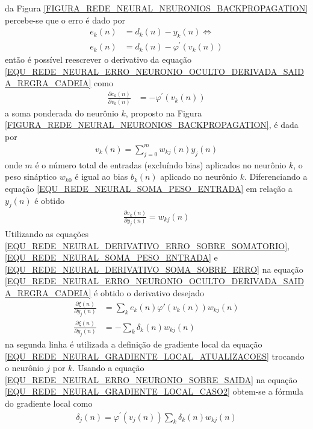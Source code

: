 da Figura \ref{FIGURA_REDE_NEURAL_NEURONIOS_BACKPROPAGATION} percebe-se que o erro é dado por
\begin{align}
e_{k}(n) &= d_{k}(n) - y_{k}(n) \Leftrightarrow \\
e_{k}(n) &= d_{k}(n) - \varphi^{'}(v_{k}(n))
\end{align}
então é possível reescrever o derivativo da equação \eqref{EQU_REDE_NEURAL_ERRO_NEURONIO_OCULTO_DERIVADA_SAIDA_REGRA_CADEIA} como
\begin{align}
\frac{\partial e_{k}(n)}{\partial v_{k}(n)} &= -\varphi^{'}(v_{k}(n))	\label{EQU_REDE_NEURAL_DERIVATIVO_ERRO_SOBRE_SOMATORIO}	   
\end{align}
a soma ponderada do neurônio \(k\), proposto na Figura \ref{FIGURA_REDE_NEURAL_NEURONIOS_BACKPROPAGATION}, é dada por
\begin{align}
v_{k}(n) = \sum\limits_{j = 0}^{m} w_{kj}(n)y_{j}(n)  \label{EQU_REDE_NEURAL_SOMA_PESO_ENTRADA}
\end{align}
onde \(m\) é o número total de entradas (excluíndo bias) aplicados no neurônio \(k\), o peso sináptico \(w_{k0}\) é igual ao bias \(b_{k}(n)\) aplicado no neurônio \(k\). Diferenciando a equação \eqref{EQU_REDE_NEURAL_SOMA_PESO_ENTRADA} em relação a \(y_{j}(n)\) é obtido
\begin{align}
\frac{\partial v_{k}(n)}{\partial y_{j}(n)} = w_{kj}(n) \label{EQU_REDE_NEURAL_DERIVATIVO_SOMA_SOBRE_ERRO}
\end{align}
Utilizando as equações \eqref{EQU_REDE_NEURAL_DERIVATIVO_ERRO_SOBRE_SOMATORIO}, \eqref{EQU_REDE_NEURAL_SOMA_PESO_ENTRADA} e \eqref{EQU_REDE_NEURAL_DERIVATIVO_SOMA_SOBRE_ERRO} na equação \eqref{EQU_REDE_NEURAL_ERRO_NEURONIO_OCULTO_DERIVADA_SAIDA_REGRA_CADEIA} é obtido o derivativo desejado
\begin{align}
\frac{\partial \xi(n)}{\partial y_{j}(n)} &= \sum\limits_{k} e_{k}(n)\varphi{'}(v_{k}(n))w_{kj}(n) \\
\frac{\partial \xi(n)}{\partial y_{j}(n)} &= -\sum\limits_{k}\delta_{k}(n)w_{kj}(n) \label{EQU_REDE_NEURAL_ERRO_NEURONIO_SOBRE_SAIDA}
\end{align}
na segunda linha é utilizada a definição de gradiente local da equação \eqref{EQU_REDE_NEURAL_GRADIENTE_LOCAL_ATUALIZACOES} trocando o neurônio \(j\) por \(k\). Usando a equação \eqref{EQU_REDE_NEURAL_ERRO_NEURONIO_SOBRE_SAIDA} na equação \eqref{EQU_REDE_NEURAL_GRADIENTE_LOCAL_CASO2} obtem-se a fórmula do gradiente local como
\begin{align}
\delta_{j}(n) = \varphi^{'}(v_{j}(n)) \sum\limits_{k}\delta_{k}(n)w_{kj}(n)
\end{align}

